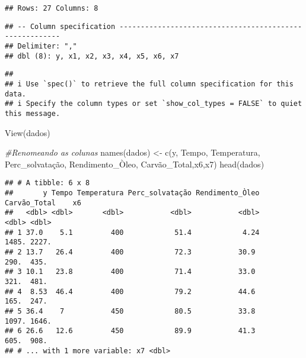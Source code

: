 \documentclass[
]{article}
\newenvironment{Shaded}{\begin{snugshade}}{\end{snugshade}}
\newcommand{\CommentTok}[1]{\textcolor[rgb]{0.56,0.35,0.01}{\textit{#1}}}
\newcommand{\FunctionTok}[1]{\textcolor[rgb]{0.00,0.00,0.00}{#1}}
\newcommand{\NormalTok}[1]{#1}
\newcommand{\OtherTok}[1]{\textcolor[rgb]{0.56,0.35,0.01}{#1}}
\newcommand{\StringTok}[1]{\textcolor[rgb]{0.31,0.60,0.02}{#1}}
\begin{document}
\begin{verbatim}
## Rows: 27 Columns: 8
\end{verbatim}

\begin{verbatim}
## -- Column specification --------------------------------------------------------
## Delimiter: ","
## dbl (8): y, x1, x2, x3, x4, x5, x6, x7
\end{verbatim}

\begin{verbatim}
## 
## i Use `spec()` to retrieve the full column specification for this data.
## i Specify the column types or set `show_col_types = FALSE` to quiet this message.
\end{verbatim}

\begin{Shaded}
\begin{Highlighting}[]
\FunctionTok{View}\NormalTok{(dados)}
\end{Highlighting}
\end{Shaded}

\begin{Shaded}
\begin{Highlighting}[]
\CommentTok{\#Renomeando as colunas}
\FunctionTok{names}\NormalTok{(dados) }\OtherTok{\textless{}{-}} \FunctionTok{c}\NormalTok{(}\StringTok{\textquotesingle{}y\textquotesingle{}}\NormalTok{, }\StringTok{\textquotesingle{}Tempo\textquotesingle{}}\NormalTok{, }\StringTok{\textquotesingle{}Temperatura\textquotesingle{}}\NormalTok{, }\StringTok{\textquotesingle{}Perc\_solvatação\textquotesingle{}}\NormalTok{, }\StringTok{\textquotesingle{}Rendimento\_Òleo\textquotesingle{}}\NormalTok{, }\StringTok{\textquotesingle{}Carvão\_Total\textquotesingle{}}\NormalTok{,}\StringTok{\textquotesingle{}x6\textquotesingle{}}\NormalTok{,}\StringTok{\textquotesingle{}x7\textquotesingle{}}\NormalTok{)}
\FunctionTok{head}\NormalTok{(dados)}
\end{Highlighting}
\end{Shaded}

\begin{verbatim}
## # A tibble: 6 x 8
##       y Tempo Temperatura Perc_solvatação Rendimento_Òleo Carvão_Total    x6
##   <dbl> <dbl>       <dbl>           <dbl>           <dbl>        <dbl> <dbl>
## 1 37.0    5.1         400            51.4            4.24        1485. 2227.
## 2 13.7   26.4         400            72.3           30.9          290.  435.
## 3 10.1   23.8         400            71.4           33.0          321.  481.
## 4  8.53  46.4         400            79.2           44.6          165.  247.
## 5 36.4    7           450            80.5           33.8         1097. 1646.
## 6 26.6   12.6         450            89.9           41.3          605.  908.
## # ... with 1 more variable: x7 <dbl>
\end{verbatim}
\end{document}
